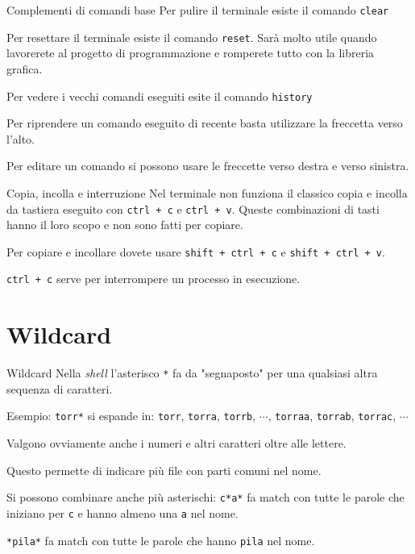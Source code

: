 \documentclass{beamer}
\begin{document}
\begin{frame}{Complementi di comandi base}
  Per pulire il terminale esiste il comando \texttt{clear}\bigskip

  Per resettare il terminale esiste il comando \texttt{reset}. Sarà molto utile
  quando lavorerete al progetto di programmazione e romperete tutto con 
  la libreria grafica.\bigskip

  Per vedere i vecchi comandi eseguiti esite il comando \texttt{history}\bigskip

  Per riprendere un comando eseguito di recente basta utilizzare la freccetta
  verso l'alto.\bigskip

  Per editare un comando si possono usare le freccette verso destra e verso 
  sinistra.\bigskip
\end{frame}

\begin{frame}{Copia, incolla e interruzione}
  Nel terminale non funziona il classico copia e incolla da tastiera eseguito
  con \texttt{ctrl + c} e \texttt{ctrl + v}. Queste combinazioni di tasti hanno 
  il loro scopo e non sono fatti per copiare.\bigskip

  Per copiare e incollare dovete usare \texttt{shift + ctrl + c} e 
  \texttt{shift + ctrl + v}.\bigskip

  \texttt{ctrl + c} serve per interrompere un processo in esecuzione.
\end{frame}


\section{Wildcard}
\begin{frame}{Wildcard}
  Nella \textit{shell} l'asterisco \texttt{*} fa da "segnaposto" per una 
  qualsiasi altra sequenza di caratteri.\bigskip

  Esempio: \texttt{torr*} si espande in: \texttt{torr}, \texttt{torra}, 
  \texttt{torrb}, $\cdots$, \texttt{torraa}, \texttt{torrab}, \texttt{torrac}, 
  $\cdots$\bigskip

  Valgono ovviamente anche i numeri e altri caratteri oltre alle lettere.\bigskip

  Questo permette di indicare più file con parti comuni nel nome.\bigskip

  Si possono combinare anche più asterischi: \texttt{c*a*} fa match con tutte le
  parole che iniziano per \texttt{c} e hanno almeno una \texttt{a} nel 
  nome.\bigskip

  \texttt{*pila*} fa match con tutte le parole che hanno \texttt{pila} nel 
  nome.\bigskip

\end{frame}
\end{document}
